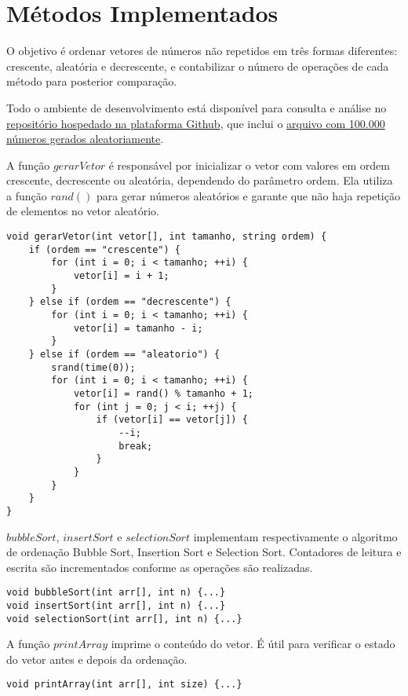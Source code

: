 \section{Métodos Implementados}
O objetivo é ordenar vetores de números não repetidos em três formas diferentes: crescente, aleatória e decrescente, e contabilizar o número de operações de cada método para posterior comparação.

Todo o ambiente de desenvolvimento está disponível para consulta e análise no \href{https://github.com/LucasWithBoots/algoritmos_ordenacao_cpp.git}{repositório hospedado na plataforma Github}, que inclui o \href{https://github.com/LucasWithBoots/algoritmos_ordenacao_cpp/blob/master/assets/vetor.txt}{arquivo com 100.000 números gerados aleatoriamente}.

A função $gerarVetor$ é responsável por inicializar o vetor com valores em ordem crescente, decrescente ou aleatória, dependendo do parâmetro ordem. Ela utiliza a função $rand()$ para gerar números aleatórios e garante que não haja repetição de elementos no vetor aleatório.

\begin{verbatim}
void gerarVetor(int vetor[], int tamanho, string ordem) {
    if (ordem == "crescente") {
        for (int i = 0; i < tamanho; ++i) {
            vetor[i] = i + 1;
        }
    } else if (ordem == "decrescente") {
        for (int i = 0; i < tamanho; ++i) {
            vetor[i] = tamanho - i;
        }
    } else if (ordem == "aleatorio") {
        srand(time(0));
        for (int i = 0; i < tamanho; ++i) {
            vetor[i] = rand() % tamanho + 1;
            for (int j = 0; j < i; ++j) {
                if (vetor[i] == vetor[j]) {
                    --i;
                    break;
                }
            }
        }
    }
}
\end{verbatim}

$bubbleSort$, $insertSort$ e $selectionSort$ implementam respectivamente o algoritmo de ordenação Bubble Sort, Insertion Sort e Selection Sort. Contadores de leitura e escrita são incrementados conforme as operações são realizadas.

\begin{verbatim}
void bubbleSort(int arr[], int n) {...}
void insertSort(int arr[], int n) {...}
void selectionSort(int arr[], int n) {...}
\end{verbatim}

A função $printArray$ imprime o conteúdo do vetor. É útil para verificar o estado do vetor antes e depois da ordenação.

\begin{verbatim}
void printArray(int arr[], int size) {...}
\end{verbatim}
